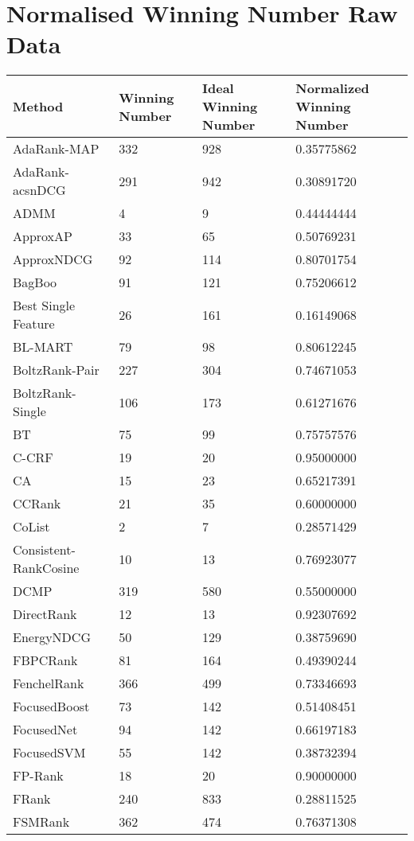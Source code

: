 \chapter{Normalised Winning Number Raw Data}
\label{app:norm_winnum_all}

\begin{table}
\begin{tabular}{l|l|l|l}
Method & Winning Number & Ideal Winning Number & Normalized Winning Number \\
\hline
AdaRank-\acs{MAP} & 332 & 928 & 0.35775862 \\ 
AdaRank-acs{nDCG} & 291 & 942 & 0.30891720 \\ 
ADMM & 4 & 9 & 0.44444444 \\ 
ApproxAP & 33 & 65 & 0.50769231 \\ 
ApproxNDCG & 92 & 114 & 0.80701754 \\ 
BagBoo & 91 & 121 & 0.75206612 \\ 
Best Single Feature & 26 & 161 & 0.16149068 \\ 
BL-MART & 79 & 98 & 0.80612245 \\ 
BoltzRank-Pair & 227 & 304 & 0.74671053 \\ 
BoltzRank-Single & 106 & 173 & 0.61271676 \\ 
BT & 75 & 99 & 0.75757576 \\ 
C-CRF & 19 & 20 & 0.95000000 \\ 
CA & 15 & 23 & 0.65217391 \\ 
CCRank & 21 & 35 & 0.60000000 \\ 
CoList & 2 & 7 & 0.28571429 \\ 
Consistent-RankCosine & 10 & 13 & 0.76923077 \\ 
DCMP & 319 & 580 & 0.55000000 \\ 
DirectRank & 12 & 13 & 0.92307692 \\ 
EnergyNDCG & 50 & 129 & 0.38759690 \\ 
FBPCRank & 81 & 164 & 0.49390244 \\ 
FenchelRank & 366 & 499 & 0.73346693 \\ 
FocusedBoost & 73 & 142 & 0.51408451 \\ 
FocusedNet & 94 & 142 & 0.66197183 \\ 
FocusedSVM & 55 & 142 & 0.38732394 \\ 
FP-Rank & 18 & 20 & 0.90000000 \\ 
FRank & 240 & 833 & 0.28811525 \\ 
FSMRank & 362 & 474 & 0.76371308 \\ 

\end{tabular}
\end{table}
